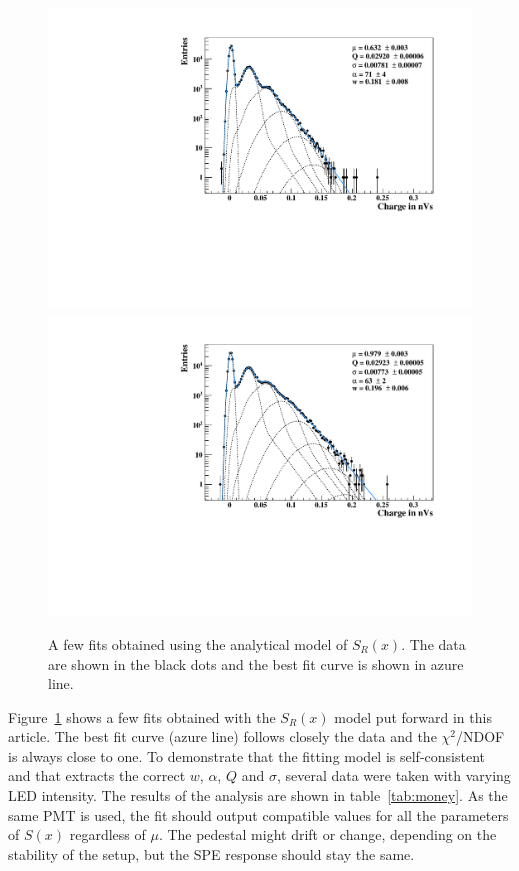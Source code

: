 \documentclass[preprint,12pt]{elsarticle}
\begin{document}
\begin{figure}[!t]
\centering
\includegraphics[width=11.75cm, height=8.0cm]{figures/fit-1-b.pdf} \\[1.5ex]
\includegraphics[width=11.75cm, height=8.0cm]{figures/fit-3-b.pdf} %
\caption{A few fits obtained using the analytical model of $S_R(x)$.  The data are shown in the black dots and the best fit curve is shown in azure line. }
\label{fig:spe}
\end{figure}
Figure~\ref{fig:spe} shows  a few fits obtained with the $S_R(x)$ model put forward in this article. 
The best fit curve (azure line) follows closely the data and the $\chi^2$/NDOF is always close to one. 
To demonstrate that the fitting model is self-consistent and that extracts the correct $w$, $\alpha$, $Q$ and $\sigma$, several data were taken with varying LED intensity. 
The results of the analysis are shown in table~\ref{tab:money}. 
As the same PMT is used, the fit should output compatible values for all the parameters of $S(x)$ regardless of $\mu$. 
The pedestal might drift or change, depending on the stability of the setup, but the SPE response should stay the same. 
\end{document}
